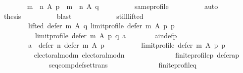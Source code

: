 \begin{isabellebody}
\ \ \ \ \ \ \isamarkupfalse%
\ {\isachardoublequoteopen}{\isacharparenleft}{\kern0pt}m\ {\isasymtriangleright}\ n{\isacharparenright}{\kern0pt}\ A\ p\ {\isacharequal}{\kern0pt}\ {\isacharparenleft}{\kern0pt}m\ {\isasymtriangleright}\ n{\isacharparenright}{\kern0pt}\ A\ q{\isachardoublequoteclose}\isanewline
\ \ \ \ \ \ \ \ \isamarkupfalse%
\ same{\isacharunderscore}{\kern0pt}profile\isanewline
\ \ \ \ \ \ \ \ \isamarkupfalse%
\ auto\isanewline
\ \ \ \ \ \ \isamarkupfalse%
\ {\isacharquery}{\kern0pt}thesis\isanewline
\ \ \ \ \ \ \ \ \isamarkupfalse%
\ blast\isanewline
\ \ \ \ \isamarkupfalse%
\isanewline
\ \ \ \ \ \ \isamarkupfalse%
\ still{\isacharunderscore}{\kern0pt}lifted{\isacharcolon}{\kern0pt}\isanewline
\ \ \ \ \ \ \ \ {\isachardoublequoteopen}lifted\ {\isacharparenleft}{\kern0pt}defer\ m\ A\ q{\isacharparenright}{\kern0pt}\ {\isacharparenleft}{\kern0pt}limit{\isacharunderscore}{\kern0pt}profile\ {\isacharparenleft}{\kern0pt}defer\ m\ A\ p{\isacharparenright}{\kern0pt}\ p{\isacharparenright}{\kern0pt}\isanewline
\ \ \ \ \ \ \ \ \ \ {\isacharparenleft}{\kern0pt}limit{\isacharunderscore}{\kern0pt}profile\ {\isacharparenleft}{\kern0pt}defer\ m\ A\ p{\isacharparenright}{\kern0pt}\ q{\isacharparenright}{\kern0pt}\ a{\isachardoublequoteclose}\isanewline
\ \ \ \ \ \ \isamarkupfalse%
\ a{\isacharunderscore}{\kern0pt}in{\isacharunderscore}{\kern0pt}def{\isacharunderscore}{\kern0pt}p{\isacharcolon}{\kern0pt}\isanewline
\ \ \ \ \ \ \ \ {\isachardoublequoteopen}a\ {\isasymin}\ defer\ n\ {\isacharparenleft}{\kern0pt}defer\ m\ A\ p{\isacharparenright}{\kern0pt}\isanewline
\ \ \ \ \ \ \ \ \ \ {\isacharparenleft}{\kern0pt}limit{\isacharunderscore}{\kern0pt}profile\ {\isacharparenleft}{\kern0pt}defer\ m\ A\ p{\isacharparenright}{\kern0pt}\ p{\isacharparenright}{\kern0pt}{\isachardoublequoteclose}\isanewline
\ \ \ \ \ \ \ \ \isamarkupfalse%
\ electoral{\isacharunderscore}{\kern0pt}mod{\isacharunderscore}{\kern0pt}m\ electoral{\isacharunderscore}{\kern0pt}mod{\isacharunderscore}{\kern0pt}n\isanewline
\ \ \ \ \ \ \ \ \ \ \ \ \ \ finite{\isacharunderscore}{\kern0pt}profile{\isacharunderscore}{\kern0pt}p\ defer{\isacharunderscore}{\kern0pt}a{\isacharunderscore}{\kern0pt}p\isanewline
\ \ \ \ \ \ \ \ \ \ \ \ \ \ seq{\isacharunderscore}{\kern0pt}comp{\isacharunderscore}{\kern0pt}def{\isacharunderscore}{\kern0pt}set{\isacharunderscore}{\kern0pt}trans\isanewline
\ \ \ \ \ \ \ \ \ \ \ \ \ \ finite{\isacharunderscore}{\kern0pt}profile{\isacharunderscore}{\kern0pt}q\isanewline

\end{isabellebody}
